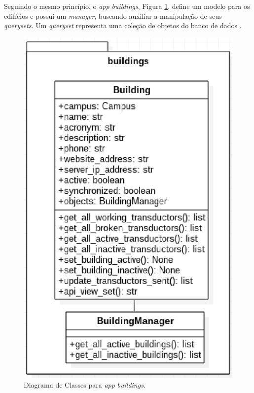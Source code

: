 Seguindo o mesmo princípio, o \textit{app} \textit{buildings}, Figura \ref{buildings}, define um modelo para os edifícios e possui um \textit{manager}, buscando auxiliar a manipulação de seus \textit{querysets}. Um \textit{queryset} representa uma coleção de objetos do banco de dados \cite{django_project}.

\begin{figure}[!h]
    \centering
    \includegraphics[keepaspectratio=true,scale=0.8]{figuras/buildings.eps}
    \caption{Diagrama de Classes para \textit{app} \textit{buildings}.}
    \label{buildings}
\end{figure}

